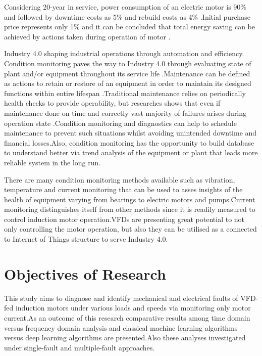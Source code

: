 Considering 20-year in service, power consumption of an electric motor is 90\% and followed by downtime costs as 5\% and rebuild costs as 4\% \cite{waide2011energy}.Initial purchase price represents only 1\% and it can be concluded that total energy saving can be achieved by actions taken during operation of motor \cite{waide2011energy}.

Industry 4.0 shaping industrial operations through automation and efficiency. Condition monitoring paves the way to Industry 4.0 through evaluating state of plant and/or equipment throughout its service life \cite{en201713306}.Maintenance can be defined as actions to retain or restore of an equipment in order to maintain its designed functions within entire lifespan \cite{en201713306}.Traditional maintenance relies on periodically health checks to provide operability, but researches shows that even if maintenance done on time and correctly vast majority of failures arises during operation state \cite{motor1985report}.Condition monitoring and diagnostics can help to schedule maintenance to prevent such situations whilst avoiding unintended downtime and financial losses.Also, condition monitoring has the opportunity to build database to understand better via trend analysis of the equipment or plant that leads more reliable system in the long run. 

There are many condition monitoring methods available such as vibration, temperature and current monitoring that can be used to asses insights of the health of equipment varying from bearings to electric motors and pumps.Current monitoring distinguishes itself from other methods since it is readily measured to control induction motor operation.VFDs are presenting great potential to not only controlling the motor operation, but also they can be utilised as a connected to Internet of Things structure to serve Industry 4.0.

\section{Objectives of Research}
\label{objectives}

This study aims to diagnose and identify mechanical and electrical faults of VFD-fed induction motors under various loads and speeds via monitoring only motor current.As an outcome of this research comparative results among time domain versus frequency domain analysis and classical machine learning algorithms versus deep learning algorithms are presented.Also these analyses investigated under single-fault and multiple-fault approaches.

